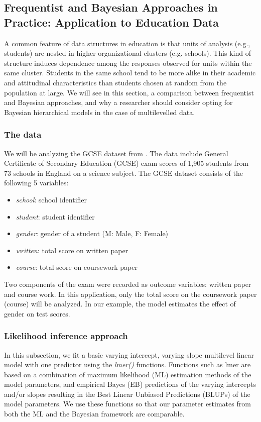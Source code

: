 \subsection{Frequentist and Bayesian Approaches in Practice: Application to Education Data}

A common feature of data structures in education is that units of analysis (e.g., students) are nested in higher organizational clusters (e.g. schools). This kind of structure induces dependence among the responses observed for units within the same cluster. Students in the same school tend to be more alike in their academic and attitudinal characteristics than students chosen at random from the population at large. We will see in this section, a comparison between frequentist and Bayesian approaches, and why a researcher should consider opting for Bayesian hierarchical models in the case of multilevelled data.

\subsubsection{The data}
We will be analyzing the GCSE dataset from \cite{rasbash2000user}. The data include General Certificate of Secondary Education (GCSE) exam scores of 1,905 students from 73 schools in England on a science subject. The GCSE dataset consists of the following 5 variables:
\begin{itemize}
	\item \textit{school}: school identifier
	\item \textit{student}: student identifier
	\item \textit{gender}: gender of a student (M: Male, F: Female)
	\item \textit{written}: total score on written paper
	\item \textit{course}: total score on coursework paper
\end{itemize}
Two components of the exam were recorded as outcome variables: written paper and course work. In this application, only the total score on the coursework paper (course) will be analyzed. In our example, the model estimates the effect of gender on test scores.

\subsubsection{Likelihood inference approach}
In this subsection, we fit a basic varying intercept, varying slope multilevel linear model with one predictor using the \textit{lmer()} functions. Functions such as lmer are based on a combination of maximum likelihood (ML) estimation methods of the model parameters, and empirical Bayes (EB) predictions of the varying intercepts and/or slopes resulting in the Best Linear Unbiased Predictions (BLUPs) of the model parameters. We use these functions so that our parameter estimates from both the ML and the Bayesian framework are comparable.

